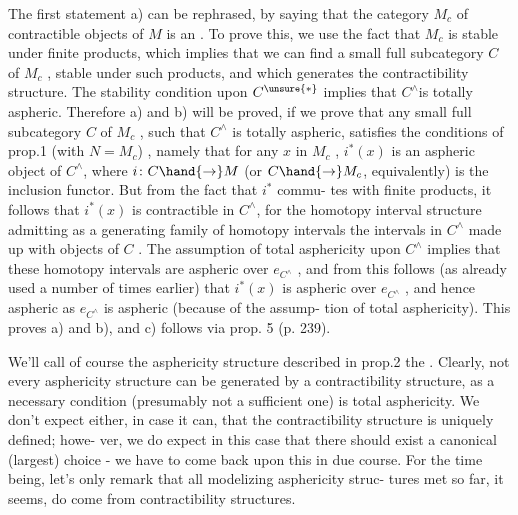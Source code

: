 
 The first statement a) can be rephrased,  by saying that
 the category $M_c$ of contractible objects of $M$ is an \hand{\uline{\textcolor{black}{aspherator}}} .  To
prove this,  we use the fact that $M_c$ is stable under finite products,
which implies that we can find a small full subcategory  $C$ of $M_c$ ,
stable under such products,  and which generates the contractibility
structure.  The stability condition upon $C^{\unsure{*}}$ implies that $C^{\wedge}$\hand{/}is totally
aspheric.  Therefore a) and b) will be proved,  if we prove that any
small full subcategory $C$ of $M_c$ ,  such that $C^{\wedge}$ is totally aspheric,
satisfies the conditions of prop.1 (with $N=M_c$) ,  namely that for any
$x$ in $M_c$ ,  $i^{*}(x)$ is an aspheric object of $C^{\wedge}$,  where $i\colon C\hand{\to} M$  (or $C\hand{\to} M_c$,
equivalently) is the inclusion functor.  But from the fact that $i^{*}$ commu-%
tes with finite products,  it follows that $i^{*}(x)$  is contractible in $C^{\wedge}$,
for the  homotopy interval structure admitting as a generating
family of homotopy intervals the intervals in $C^{\wedge}$ made up with objects of
$C$ .  The assumption of total asphericity upon $C^{\wedge}$ implies that these
homotopy intervals are aspheric over $e_{C^{\wedge}}$ ,  and from this follows 
(as already used a number of times earlier)  that $i^{*}(x)$  is aspheric
over $e_{C^{\wedge}}$ ,  and hence aspheric as $e_{C^{\wedge}}$ is aspheric (because of the assump-%
tion of total asphericity).  This proves a) and b),  and c) follows via
prop. 5 (p. 239).

We'll call of course the asphericity structure described in prop.2
the \hand{\uline{\textcolor{black}{asphericity}}} \hand{\uline{\textcolor{black}{structure}}} \hand{\uline{\textcolor{black}{generated}}} 
\hand{\uline{\textcolor{black}{ture}}}.
 Clearly,  not every asphericity structure can be generated by a
contractibility structure,  as a necessary condition (presumably not a
sufficient one) is total asphericity.  We don't expect either,  in case
 it can,  that the  contractibility structure is uniquely defined;  howe-%
ver,  we do expect in this case that there should exist a canonical
(largest) choice - we have to come back upon this in due course. For
the time being,  let's only remark that all modelizing asphericity struc-%
tures met  so far,  it seems,  do come from contractibility structures.

